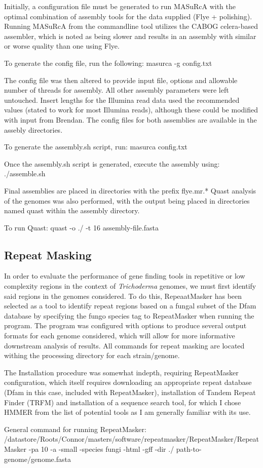 \documentclass[12pt]{article}
\begin{document}
Initially, a configuration file must be generated to run MASuRcA with
the optimal combination of assembly tools for the data supplied (Flye
+ polishing). Running MASuRcA from the commandline tool utilizes the
CABOG celera-based assembler, which is noted as being slower and
results in an assembly with similar or worse quality than one using
Flye.

To generate the config file, run the following:
masurca -g config.txt

The config file was then altered to provide input file, options and
allowable number of threads for assembly. All other assembly
parameters were left untouched. Insert lengths for the Illumina read
data used the recommended values (stated to work for most Illumina
reads), although these could be modified with input from Brendan. The
config files for both assemblies are available in the assebly
directories.

To generate the assembly.sh script, run:
masurca config.txt

Once the assembly.sh script is generated, execute the assembly using:
./assemble.sh

Final assemblies are placed in directories with the prefix flye.mr.*
Quast analysis of the genomes was also performed, with the output
being placed in directories named quast within the assembly directory.

To run Quast:
quast -o ./ -t 16 assembly-file.fasta

\subsection{Repeat Masking}

In order to evaluate the performance of gene finding tools in
repetitive or low complexity regions in the context of
\textit{Trichoderma} genomes, we must first identify said regions in
the genomes considered. To do this, RepeaatMasker has been selected as
a tool to identify repeat regions based on a fungal subset of the Dfam
database by specifying the fungo species tag to RepeatMasker when
running the program. The program was configured with options to
produce several output formats for each genome considered, which will
allow for more informative downstream analysis of results. All
commands for repeat masking are located withing the processing
directory for each strain/genome.

The Installation procedure was somewhat indepth, requiring
RepeatMasker configuration, which itself requires downloading an
appropriate repeat database (Dfam in this case, included with
RepeatMasker), installation of Tandem Repeat Finder (TRFM) and
installation of a sequence search tool, for which I chose HMMER from
the list of potential tools as I am generally familiar with its use.

General command for running RepeatMasker:
/datastore/Roots/Connor/masters/software/repeatmasker/RepeatMasker/RepeatMasker
-pa 10 -a -small -species fungi -html -gff -dir ./
path-to-genome/genome.fasta


\section{}
\end{document}
